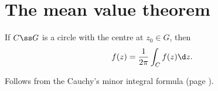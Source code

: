 \section{The mean value theorem}

\begin{lemma}
  If $C \ss G$ is a circle with the centre at $z_0 \in G$, then
  $$ f(z) = \frac{1}{2 \pi} \int_{C} f(z) \d z. $$
\end{lemma}

\begin{idea}
  Follows from the Cauchy's minor integral formula (page \pageref{Cauchy, minor integral formula}).
\end{idea}